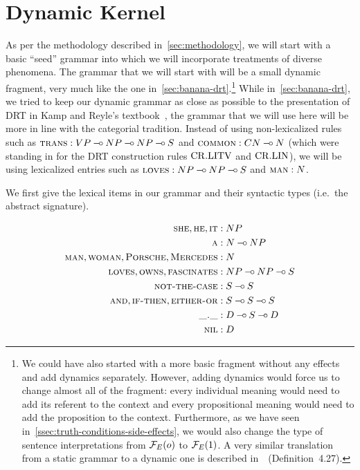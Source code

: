 \minitoc


\section{Dynamic Kernel}
\label{sec:dynamic-kernel}

As per the methodology described in~\ref{sec:methodology}, we will start
with a basic ``seed'' grammar into which we will incorporate treatments of
diverse phenomena. The grammar that we will start with will be a small
dynamic fragment, very much like the one
in~\ref{sec:banana-drt}.\footnote{We could have also started with a more
  basic fragment without any effects and add dynamics separately. However,
  adding dynamics would force us to change almost all of the fragment:
  every individual meaning would need to add its referent to the context
  and every propositional meaning would need to add the proposition to the
  context. Furthermore, as we have seen
  in~\ref{ssec:truth-conditions-side-effects}, we would also change the
  type of sentence interpretations from $\mathcal{F}_E(o)$ to $\mathcal{F}_E(1)$. A very
  similar translation from a static grammar to a dynamic one is described
  in~\cite{lebedeva2012expression}~(Definition~4.27).} While
in~\ref{sec:banana-drt}, we tried to keep our dynamic grammar as close as
possible to the presentation of DRT in Kamp and Reyle's
textbook~\cite{kamp1993discourse}, the grammar that we will use here will
be more in line with the categorial tradition. Instead of using
non-lexicalized rules such as $\textsc{trans} : VP \mathbin{{-}\mkern-3.5mu{\circ}} NP \mathbin{{-}\mkern-3.5mu{\circ}} NP \mathbin{{-}\mkern-3.5mu{\circ}} S$
and $\textsc{common} : CN \mathbin{{-}\mkern-3.5mu{\circ}} N$ (which were standing in for the DRT
construction rules $\mathrm{CR.LITV}$ and $\mathrm{CR.LIN}$), we will be using lexicalized
entries such as $\textsc{loves} : NP \mathbin{{-}\mkern-3.5mu{\circ}} NP \mathbin{{-}\mkern-3.5mu{\circ}} S$ and $\textsc{man} : N$.

We first give the lexical items in our grammar and their syntactic types
(i.e.\ the abstract signature).

\begin{align*}
  \textsc{she}, \textsc{he}, \textsc{it} &: NP \\
  \textsc{a} &: N \mathbin{{-}\mkern-3.5mu{\circ}} NP \\
  \textsc{man}, \textsc{woman}, \textsc{Porsche}, \textsc{Mercedes} &: N \\
  \textsc{loves}, \textsc{owns}, \textsc{fascinates} &: NP \mathbin{{-}\mkern-3.5mu{\circ}} NP \mathbin{{-}\mkern-3.5mu{\circ}} S \\
  \textsc{not-the-case} &: S \mathbin{{-}\mkern-3.5mu{\circ}} S \\
  \textsc{and}, \textsc{if-then}, \textsc{either-or} &: S \mathbin{{-}\mkern-3.5mu{\circ}} S \mathbin{{-}\mkern-3.5mu{\circ}} S \\
  \textsc{\_.\_} &: D \mathbin{{-}\mkern-3.5mu{\circ}} S \mathbin{{-}\mkern-3.5mu{\circ}} D \\
  \textsc{nil} &: D
\end{align*}

